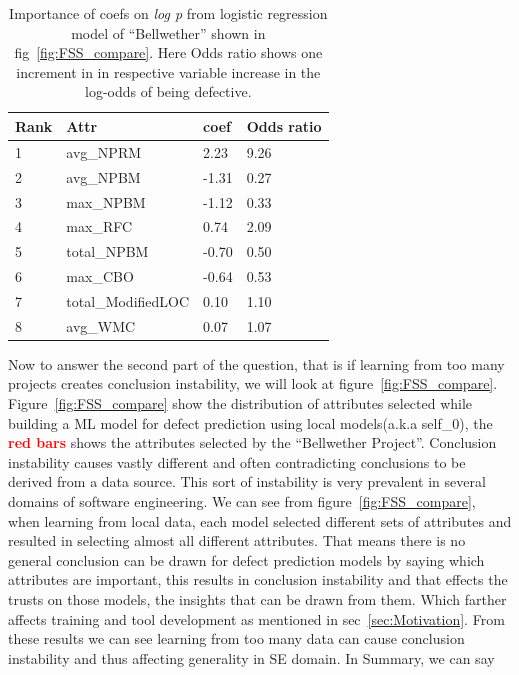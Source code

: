 \documentclass[10pt,journal,compsoc]{IEEEtran}
\begin{document}
\begin{table}[!t]
\centering
\begin{tabular}{|l|l|l|l|} \hline
Rank & Attr               & coef  & Odds ratio \\ \hline
1    & avg\_NPRM          & 2.23  & 9.26      \\ \hline
2    & avg\_NPBM          & -1.31 & 0.27      \\ \hline
3    & max\_NPBM          & -1.12 & 0.33      \\ \hline
4    & max\_RFC           & 0.74  & 2.09      \\ \hline 
5    & total\_NPBM        & -0.70 & 0.50      \\ \hline
6    & max\_CBO           & -0.64 & 0.53      \\ \hline
7    & total\_ModifiedLOC & 0.10  & 1.10      \\ \hline
8    & avg\_WMC           & 0.07  & 1.07     \\ \hline
\end{tabular}
\label{tbl:coefs}
\caption{Importance of coefs on \textit{log p} from logistic regression model of ``Bellwether'' shown in fig~\ref{fig:FSS_compare}. Here Odds ratio shows one increment in in respective variable increase in the log-odds of being defective.}
\end{table}

Now to answer the second part of the question, that is if learning from too many projects creates conclusion instability, we will look at figure~\ref{fig:FSS_compare}. Figure~\ref{fig:FSS_compare} show the distribution of attributes selected while building a ML model for defect prediction using local models(a.k.a self\_0), the \textcolor{red}{{\bf red bars}} shows the attributes selected by the ``Bellwether Project''. Conclusion instability causes vastly different and often contradicting conclusions to be derived from a data source. This sort of instability is very prevalent in several domains of software engineering. We can see from figure~\ref{fig:FSS_compare}, when learning from local data, each model selected different sets of attributes and resulted in selecting almost all different attributes. That means there is no general conclusion can be drawn for defect prediction models by saying which attributes are important, this results in conclusion instability and that effects the trusts on those models, the insights that can be drawn from them. Which farther affects training and tool development as mentioned in sec~\ref{sec:Motivation}. From these results we can see learning from too many data can cause conclusion instability and thus affecting generality in SE domain. In Summary, we can say 
\end{document}
